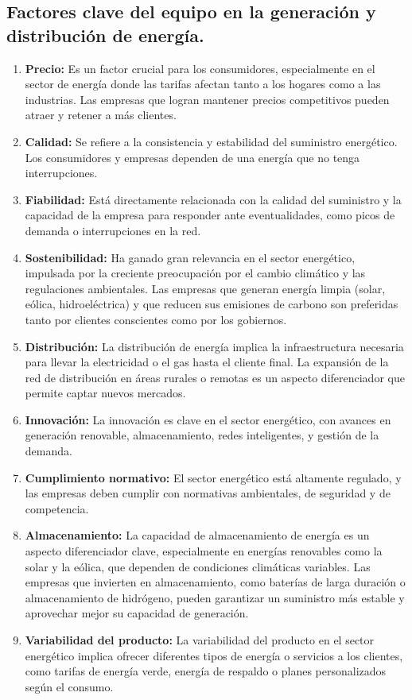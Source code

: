 \documentclass{article}
\begin{document}
\subsection{Factores clave del equipo en la generación y distribución de energía.}
\begin{enumerate}
    \item \textbf{Precio:} Es un factor crucial para los consumidores, especialmente en el sector de energía donde las tarifas afectan tanto a los hogares como a las industrias. Las empresas que logran mantener precios competitivos pueden atraer y retener a más clientes. 
    \item \textbf{Calidad:} Se refiere a la consistencia y estabilidad del suministro energético. Los consumidores y empresas dependen de una energía que no tenga interrupciones. 

    \item \textbf{Fiabilidad:} Está directamente relacionada con la calidad del suministro y la capacidad de la empresa para responder ante eventualidades, como picos de demanda o interrupciones en la red. 
    \item \textbf{Sostenibilidad:} Ha ganado gran relevancia en el sector energético, impulsada por la creciente preocupación por el cambio climático y las regulaciones ambientales. Las empresas que generan energía limpia (solar, eólica, hidroeléctrica) y que reducen sus emisiones de carbono son preferidas tanto por clientes conscientes como por los gobiernos.

    \item \textbf{Distribución:} La distribución de energía implica la infraestructura necesaria para llevar la electricidad o el gas hasta el cliente final. La expansión de la red de distribución en áreas rurales o remotas es un aspecto diferenciador que permite captar nuevos mercados.

    \item \textbf{Innovación:} La innovación es clave en el sector energético, con avances en generación renovable, almacenamiento, redes inteligentes, y gestión de la demanda. 

    \item \textbf{Cumplimiento normativo:} El sector energético está altamente regulado, y las empresas deben cumplir con normativas ambientales, de seguridad y de competencia.

    \item \textbf{Almacenamiento:} La capacidad de almacenamiento de energía es un aspecto diferenciador clave, especialmente en energías renovables como la solar y la eólica, que dependen de condiciones climáticas variables. Las empresas que invierten en almacenamiento, como baterías de larga duración o almacenamiento de hidrógeno, pueden garantizar un suministro más estable y aprovechar mejor su capacidad de generación.

    \item \textbf{Variabilidad del producto:} La variabilidad del producto en el sector energético implica ofrecer diferentes tipos de energía o servicios a los clientes, como tarifas de energía verde, energía de respaldo o planes personalizados según el consumo. 

\end{enumerate}
\end{document}
